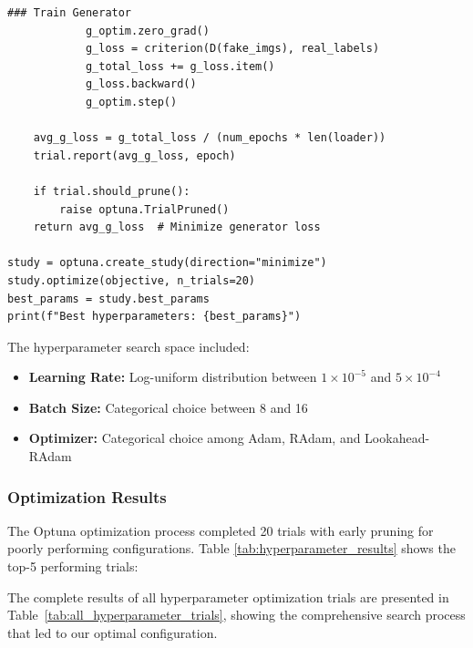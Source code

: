 \documentclass[a4paper, journal]{IEEEtran}
\begin{document}
\begin{lstlisting}[caption=Hyperparameter Optimization with Optuna]
            ### Train Generator
            g_optim.zero_grad()
            g_loss = criterion(D(fake_imgs), real_labels)
            g_total_loss += g_loss.item()
            g_loss.backward()
            g_optim.step()
    
    avg_g_loss = g_total_loss / (num_epochs * len(loader))
    trial.report(avg_g_loss, epoch)

    if trial.should_prune():
        raise optuna.TrialPruned()
    return avg_g_loss  # Minimize generator loss

study = optuna.create_study(direction="minimize")
study.optimize(objective, n_trials=20)
best_params = study.best_params
print(f"Best hyperparameters: {best_params}")
\end{lstlisting}

The hyperparameter search space included:
\begin{itemize}
    \item \textbf{Learning Rate:} Log-uniform distribution between $1 \times 10^{-5}$ and $5 \times 10^{-4}$
    \item \textbf{Batch Size:} Categorical choice between 8 and 16
    \item \textbf{Optimizer:} Categorical choice among Adam, RAdam, and Lookahead-RAdam
\end{itemize}

\subsubsection{Optimization Results}
The Optuna optimization process completed 20 trials with early pruning for poorly performing configurations. Table \ref{tab:hyperparameter_results} shows the top-5 performing trials:



The complete results of all hyperparameter optimization trials are presented in Table~\ref{tab:all_hyperparameter_trials}, showing the comprehensive search process that led to our optimal configuration.
\end{document}
